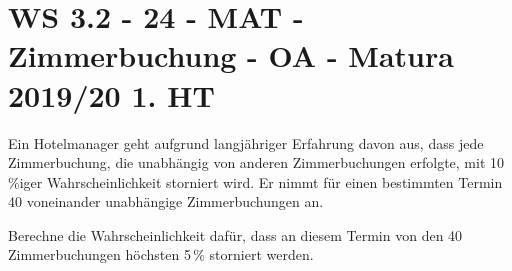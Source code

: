 \section{WS 3.2 - 24 - MAT - Zimmerbuchung - OA - Matura 2019/20 1. HT}

\begin{beispiel}[WS 3.2]{1}
Ein Hotelmanager geht aufgrund langjähriger Erfahrung davon aus, dass jede Zimmerbuchung, die unabhängig von anderen Zimmerbuchungen erfolgte, mit 10\,\%iger Wahrscheinlichkeit storniert wird. Er nimmt für einen bestimmten Termin 40 voneinander unabhängige Zimmerbuchungen an.

Berechne die Wahrscheinlichkeit dafür, dass an diesem Termin von den 40 Zimmerbuchungen höchsten 5\,\% storniert werden.

\end{beispiel}
